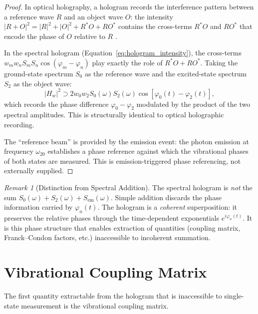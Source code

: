 \documentclass[11pt,twocolumn,a4paper]{article}
\theoremstyle{definition}
\theoremstyle{remark}
\newtheorem{remark}[theorem]{Remark}
\begin{document}
\begin{proof}
In optical holography, a hologram records the interference pattern between a reference wave $R$ and an object wave $O$: the intensity $|R + O|^2 = |R|^2 + |O|^2 + R^*O + RO^*$ contains the cross-terms $R^*O$ and $RO^*$ that encode the phase of $O$ relative to $R$ \citep{bornwolf1999}.

In the spectral hologram (Equation~\ref{eq:hologram_intensity}), the cross-terms $w_m w_n S_m S_n \cos(\varphi_m - \varphi_n)$ play exactly the role of $R^*O + RO^*$. Taking the ground-state spectrum $S_0$ as the reference wave and the excited-state spectrum $S_2$ as the object wave:
\begin{equation}
|H_w|^2 \supset 2w_0 w_2 S_0(\omega) S_2(\omega) \cos[\varphi_0(t) - \varphi_2(t)],
\end{equation}
which records the phase difference $\varphi_0 - \varphi_2$ modulated by the product of the two spectral amplitudes. This is structurally identical to optical holographic recording.

The ``reference beam'' is provided by the emission event: the photon emission at frequency $\omega_{20}$ establishes a phase reference against which the vibrational phases of both states are measured. This is emission-triggered phase referencing, not externally supplied.
\end{proof}

\begin{remark}[Distinction from Spectral Addition]
\label{rem:not_addition}
The spectral hologram is \emph{not} the sum $S_0(\omega) + S_2(\omega) + S_{\mathrm{em}}(\omega)$. Simple addition discards the phase information carried by $\varphi_n(t)$. The hologram is a \emph{coherent} superposition: it preserves the relative phases through the time-dependent exponentials $e^{i\varphi_n(t)}$. It is this phase structure that enables extraction of quantities (coupling matrix, Franck--Condon factors, etc.) inaccessible to incoherent summation.
\end{remark}

\section{Vibrational Coupling Matrix}
\label{sec:coupling}

The first quantity extractable from the hologram that is inaccessible to single-state measurement is the vibrational coupling matrix.
\end{document}
